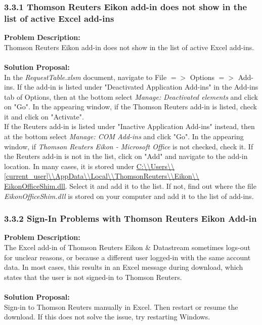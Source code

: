 \subsubsection{3.3.1 Thomson Reuters Eikon add-in does not show in the list of active Excel add-ins}
\textbf{Problem Description: }  \\
Thomson Reuters Eikon add-in does not show in the list of active Excel add-ins. \\ \\
\textbf{Solution Proposal:} \\
In the \textit{RequestTable.xlsm} document, navigate to File $ => $ Options $ => $ Add-ins. If the add-in is listed under "Deactivated Application Add-ins" in the Add-ins tab of Options, then at the bottom select \textit{Manage: Deactivated elements} and click on "Go". In the appearing window, if the Thomson Reuters add-in is listed, check it and click on "Activate". \\
If the Reuters add-in is listed under "Inactive Application Add-ins" instead, then at the bottom select \textit{Manage: COM Add-ins} and click "Go". In the appearing window, if \textit{Thomson Reuters Eikon - Microsoft Office} is not checked, check it. If the Reuters add-in is not in the list, click on "Add" and navigate to the add-in location. In many cases, it is stored under 
\url{C:\\Users\\[current_user]\\AppData\\Local\\ThomsonReuters\\Eikon\\} \\ \url{EikonOfficeShim.dll}. 
Select it and add it to the list. If not, find out where the file \textit{EikonOfficeShim.dll} is stored on your computer and add it to the list of add-ins. 

\subsubsection{3.3.2 Sign-In Problems with Thomson Reuters Eikon Add-in}
\textbf{Problem Description: }  \\
The Excel add-in of Thomson Reuters Eikon \& Datastream sometimes logs-out for unclear reasons, or because a different user logged-in with the same account data. In most cases, this results in an Excel message during download, which states that the user is not signed-in to Thomson Reuters. \\ \\
\textbf{Solution Proposal:} \\
Sign-in to Thomson Reuters manually in Excel. Then restart or resume the download. If this does not solve the issue, try restarting Windows. 

